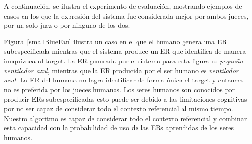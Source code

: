 \begin{table}[H]


A continuaci\'on, se ilustra el experimento de evaluaci\'on, mostrando ejemplos de casos en los que la expresi\'on del sistema fue considerada mejor por ambos jueces, por un solo juez o por ninguno de los dos.

Figura~\ref{smallBlueFan} ilustra un caso en el que el humano genera una ER subespecificada mientras que el sistema produce un ER que identifica de manera inequ\'{i}voca al target. La ER generada por el sistema para esta figura es {\it peque\~no ventilador azul}, mientras que la ER producida por el ser humano es {\it ventilador azul}. La ER del humano no logra identificar de forma \'unica el target y entonces no es preferida por los jueces humanos. Los seres humanos son conocidos por producir ERs subespecificadas esto puede ser debido a las limitaciones cognitivas por no ser capaz de considerar todo el contexto referencial al mismo tiempo. Nuestro algoritmo es capaz de considerar todo el contexto referencial y combinar esta capacidad con la probabilidad de uso de las ERs aprendidas de los seres humanos.





\end{table}

